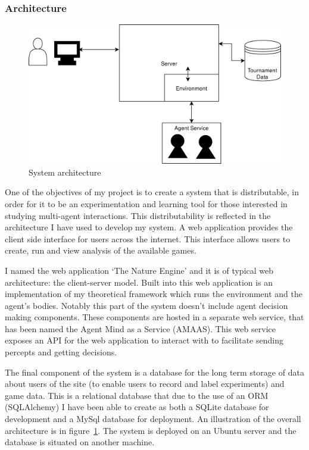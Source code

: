 \documentclass[]{final_report}
\begin{document}
\subsubsection{Architecture}
\begin{figure}
\vspace{-30pt}
\begin{framed}
	\begin{center}
	\includegraphics[width=\textwidth]{PresSystem.png}
	\caption{System architecture}
	\label{fig:architecture}
	\end{center}
\end{framed}
\vspace{-30pt}
\end{figure}
One of the objectives of my project is to create a system that is distributable, in order for it to be an experimentation and learning tool for those interested in studying multi-agent interactions. This distributability is reflected in the architecture I have used to develop my system. A web application provides the client side interface for users across the internet. This interface allows users to create, run and view analysis of the available games.\par 
I named the web application `The Nature Engine' and it is of typical web architecture: the client-server model. Built into this web application is an implementation of my theoretical framework which runs the environment and the agent's bodies. Notably this part of the system doesn't include agent decision making components. These components are hosted in a separate web service, that has been named the Agent Mind as a Service (AMAAS). This web service exposes an API for the web application to interact with to facilitate sending percepts and getting decisions.\par 
The final component of the system is a database for the long term storage of data about users of the site (to enable users to record and label experiments) and game data. This is a relational database that due to the use of an ORM (SQLAlchemy) I have been able to create as both a SQLite database for development and a MySql database for deployment. An illustration of the overall architecture is in figure~\ref{fig:architecture}. The system is deployed on an Ubuntu server and the database is situated on another machine.
\end{document}
